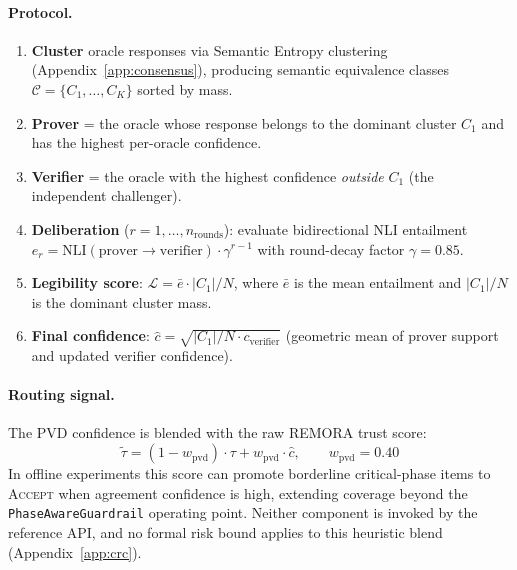 \documentclass[10pt,twocolumn]{article}
\begin{document}
\paragraph{Protocol.}
\begin{enumerate}[leftmargin=*,label=\arabic*.]
  \item \textbf{Cluster} oracle responses via Semantic Entropy clustering
        \cite{kuhn2023semantic,farquhar2024detecting}
        (Appendix~\ref{app:consensus}), producing semantic equivalence classes
        $\mathcal{C} = \{C_1, \ldots, C_K\}$ sorted by mass.
  \item \textbf{Prover} = the oracle whose response belongs to the
        dominant cluster $C_1$ and has the highest per-oracle confidence.
  \item \textbf{Verifier} = the oracle with the highest confidence
        \emph{outside} $C_1$ (the independent challenger).
  \item \textbf{Deliberation} ($r = 1, \ldots, n_{\text{rounds}}$):
        evaluate bidirectional NLI entailment
        $e_r = \text{NLI}(\text{prover} \to \text{verifier}) \cdot \gamma^{r-1}$
        with round-decay factor $\gamma = 0.85$.
  \item \textbf{Legibility score}:
        $\mathcal{L} = \bar{e} \cdot |C_1| / N$,
        where $\bar{e}$ is the mean entailment and $|C_1|/N$ is the
        dominant cluster mass.
  \item \textbf{Final confidence}:
        $\hat{c} = \sqrt{|C_1|/N \cdot c_{\text{verifier}}}$
        (geometric mean of prover support and updated verifier confidence).
\end{enumerate}

\paragraph{Routing signal.}
The PVD confidence is blended with the raw REMORA trust score:
\begin{equation}
  \tilde{\tau} = (1 - w_{\text{pvd}}) \cdot \tau + w_{\text{pvd}} \cdot \hat{c},
  \qquad w_{\text{pvd}} = 0.40
  \label{eq:pvd_blend}
\end{equation}
In offline experiments this score can promote borderline critical-phase
items to \textsc{Accept} when agreement confidence is high, extending
coverage beyond the \texttt{PhaseAwareGuardrail} operating point. Neither
component is invoked by the reference API, and no formal risk bound
applies to this heuristic blend (Appendix~\ref{app:crc}).
\end{document}
